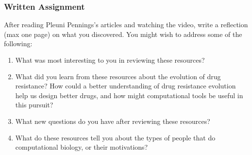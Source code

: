 \documentclass{article}
\begin{document}
\subsubsection*{Written Assignment} 
After reading Pleuni Pennings's articles and watching the video, write a reflection (max one page) on what you discovered. You might wish to address some of the following: 

\begin{enumerate}
\item What was most interesting to you in reviewing these resources?
\item What did you learn from these resources about the evolution of drug resistance? How could a better understanding of drug resistance evolution help us design better drugs, and how might computational tools be useful in this pursuit?
\item What new questions do you have after reviewing these resources?
\item What do these resources tell you about the types of people that do computational biology, or their motivations?
\end{enumerate}
\EndAccSupp{}
\end{document}

